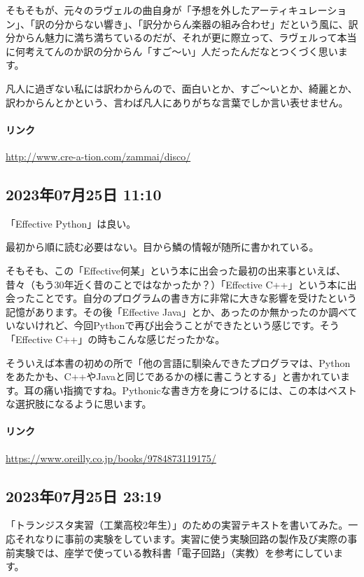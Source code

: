 そもそもが、元々のラヴェルの曲自身が「予想を外したアーティキュレーション」、「訳の分からない響き」、「訳分からん楽器の組み合わせ」だという風に、訳分からん魅力に満ち満ちているのだが、それが更に際立って、ラヴェルって本当に何考えてんのか訳の分からん「すご〜い」人だったんだなとつくづく思います。

凡人に過ぎない私には訳わからんので、面白いとか、すご〜いとか、綺麗とか、訳わからんとかという、言わば凡人にありがちな言葉でしか言い表せません。

\paragraph{リンク}
\url{http://www.cre-a-tion.com/zammai/disco/}

\subsection*{2023年07月25日 11:10}

「Effective Python」は良い。

最初から順に読む必要はない。目から鱗の情報が随所に書かれている。

そもそも、この「Effective何某」という本に出会った最初の出来事といえば、昔々（もう30年近く昔のことではなかったか？）「Effective C++」という本に出会ったことです。自分のプログラムの書き方に非常に大きな影響を受けたという記憶があります。その後「Effective Java」とか、あったのか無かったのか調べていないけれど、今回Pythonで再び出会うことができたという感じです。そう「Effective C++」の時もこんな感じだったかな。

そういえば本書の初めの所で「他の言語に馴染んできたプログラマは、Pythonをあたかも、C++やJavaと同じであるかの様に書こうとする」と書かれています。耳の痛い指摘ですね。Pythonicな書き方を身につけるには、この本はベストな選択肢になるように思います。

\paragraph{リンク}
\url{https://www.oreilly.co.jp/books/9784873119175/}

\subsection*{2023年07月25日 23:19}

「トランジスタ実習（工業高校2年生）」のための実習テキストを書いてみた。一応それなりに事前の実験をしています。実習に使う実験回路の製作及び実際の事前実験では、座学で使っている教科書「電子回路」（実教）を参考にしています。

